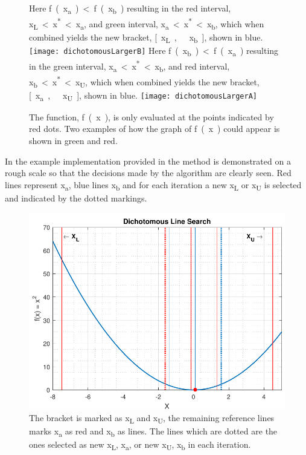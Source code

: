 \begin{figure}[H]
  \begin{minipage}{\linewidth}
    \captionsetup[subfigure]{font = footnotesize}
    \centering
    \subcaptionbox
    {
      Here \si{f(x_a) < f(x_b)} resulting in the red interval, \si{x_{L} < x^* < x_a}, and green interval, \si{x_a < x^* < x_b}, which when combined yields the new bracket, \si{[x_{L},\ x_b]}, shown in blue.
      \label{dichotomousLargerB}
    }
    {
      \texttt{[image: dichotomousLargerB]}
    }\quad
    \subcaptionbox
    {
      Here \si{f(x_b) < f(x_a)} resulting in the green interval, \si{x_a < x^* < x_b}, and red interval, \si{x_b < x^* < x_{U}}, which when combined yields the new bracket, \si{[x_a,\ x_{U}]}, shown in blue.
      \label{dichotomousLargerA}
    }
    {
      \texttt{[image: dichotomousLargerA]}
    }
    \caption{The function, \si{f(x)}, is only evaluated at the points indicated by red dots. Two examples of how the graph of \si{f(x)} could appear is shown in green and red.}
    \label{dichotomousLargerAorB}
  \end{minipage}
\end{figure}

In the example implementation provided in  the method is demonstrated on a rough scale so that the decisions made by the algorithm are clearly seen. Red lines represent \si{x_a}, blue lines \si{x_b} and for each iteration a new \si{x_{L}} or \si{x_{U}} is selected and indicated by the dotted markings.
%
\begin{figure}[H]
	\centering
	\includegraphics[width=.5\textwidth]{figures/dichotomousLineSearchComprehension.pdf}
	\caption{The bracket is marked as \si{x_{L}} and \si{x_{U}}, the remaining reference lines marks \si{x_a} as red and \si{x_b} as lines. The lines which are dotted are the ones selected as new \si{x_{L}}, \si{x_a}, or new \si{x_{U}}, \si{x_b} in each iteration.}
	\label{dichotomousLineSearchComprehensive}
\end{figure}
